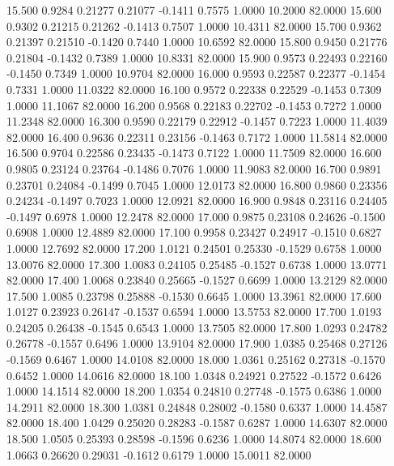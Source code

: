   15.500   0.9284   0.21277   0.21077  -0.1411   0.7575   1.0000  10.2000  82.0000
  15.600   0.9302   0.21215   0.21262  -0.1413   0.7507   1.0000  10.4311  82.0000
  15.700   0.9362   0.21397   0.21510  -0.1420   0.7440   1.0000  10.6592  82.0000
  15.800   0.9450   0.21776   0.21804  -0.1432   0.7389   1.0000  10.8331  82.0000
  15.900   0.9573   0.22493   0.22160  -0.1450   0.7349   1.0000  10.9704  82.0000
  16.000   0.9593   0.22587   0.22377  -0.1454   0.7331   1.0000  11.0322  82.0000
  16.100   0.9572   0.22338   0.22529  -0.1453   0.7309   1.0000  11.1067  82.0000
  16.200   0.9568   0.22183   0.22702  -0.1453   0.7272   1.0000  11.2348  82.0000
  16.300   0.9590   0.22179   0.22912  -0.1457   0.7223   1.0000  11.4039  82.0000
  16.400   0.9636   0.22311   0.23156  -0.1463   0.7172   1.0000  11.5814  82.0000
  16.500   0.9704   0.22586   0.23435  -0.1473   0.7122   1.0000  11.7509  82.0000
  16.600   0.9805   0.23124   0.23764  -0.1486   0.7076   1.0000  11.9083  82.0000
  16.700   0.9891   0.23701   0.24084  -0.1499   0.7045   1.0000  12.0173  82.0000
  16.800   0.9860   0.23356   0.24234  -0.1497   0.7023   1.0000  12.0921  82.0000
  16.900   0.9848   0.23116   0.24405  -0.1497   0.6978   1.0000  12.2478  82.0000
  17.000   0.9875   0.23108   0.24626  -0.1500   0.6908   1.0000  12.4889  82.0000
  17.100   0.9958   0.23427   0.24917  -0.1510   0.6827   1.0000  12.7692  82.0000
  17.200   1.0121   0.24501   0.25330  -0.1529   0.6758   1.0000  13.0076  82.0000
  17.300   1.0083   0.24105   0.25485  -0.1527   0.6738   1.0000  13.0771  82.0000
  17.400   1.0068   0.23840   0.25665  -0.1527   0.6699   1.0000  13.2129  82.0000
  17.500   1.0085   0.23798   0.25888  -0.1530   0.6645   1.0000  13.3961  82.0000
  17.600   1.0127   0.23923   0.26147  -0.1537   0.6594   1.0000  13.5753  82.0000
  17.700   1.0193   0.24205   0.26438  -0.1545   0.6543   1.0000  13.7505  82.0000
  17.800   1.0293   0.24782   0.26778  -0.1557   0.6496   1.0000  13.9104  82.0000
  17.900   1.0385   0.25468   0.27126  -0.1569   0.6467   1.0000  14.0108  82.0000
  18.000   1.0361   0.25162   0.27318  -0.1570   0.6452   1.0000  14.0616  82.0000
  18.100   1.0348   0.24921   0.27522  -0.1572   0.6426   1.0000  14.1514  82.0000
  18.200   1.0354   0.24810   0.27748  -0.1575   0.6386   1.0000  14.2911  82.0000
  18.300   1.0381   0.24848   0.28002  -0.1580   0.6337   1.0000  14.4587  82.0000
  18.400   1.0429   0.25020   0.28283  -0.1587   0.6287   1.0000  14.6307  82.0000
  18.500   1.0505   0.25393   0.28598  -0.1596   0.6236   1.0000  14.8074  82.0000
  18.600   1.0663   0.26620   0.29031  -0.1612   0.6179   1.0000  15.0011  82.0000
